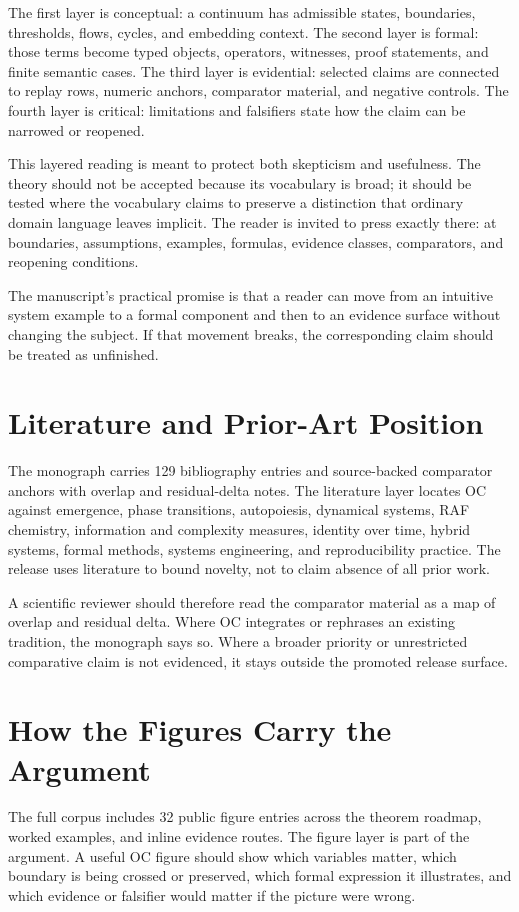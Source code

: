 The first layer is conceptual: a continuum has admissible states, boundaries, thresholds, flows, cycles, and embedding context. The second layer is formal: those terms become typed objects, operators, witnesses, proof statements, and finite semantic cases. The third layer is evidential: selected claims are connected to replay rows, numeric anchors, comparator material, and negative controls. The fourth layer is critical: limitations and falsifiers state how the claim can be narrowed or reopened.

This layered reading is meant to protect both skepticism and usefulness. The theory should not be accepted because its vocabulary is broad; it should be tested where the vocabulary claims to preserve a distinction that ordinary domain language leaves implicit. The reader is invited to press exactly there: at boundaries, assumptions, examples, formulas, evidence classes, comparators, and reopening conditions.

The manuscript's practical promise is that a reader can move from an intuitive system example to a formal component and then to an evidence surface without changing the subject. If that movement breaks, the corresponding claim should be treated as unfinished.


\section{Literature and Prior-Art Position}
\label{sec:oc133-literature-prior-art-position}
The monograph carries 129 bibliography entries and source-backed comparator anchors with overlap and residual-delta notes. The literature layer locates OC against emergence, phase transitions, autopoiesis, dynamical systems, RAF chemistry, information and complexity measures, identity over time, hybrid systems, formal methods, systems engineering, and reproducibility practice. The release uses literature to bound novelty, not to claim absence of all prior work.

A scientific reviewer should therefore read the comparator material as a map of overlap and residual delta. Where OC integrates or rephrases an existing tradition, the monograph says so. Where a broader priority or unrestricted comparative claim is not evidenced, it stays outside the promoted release surface.


\section{How the Figures Carry the Argument}
\label{sec:oc133-figure-route-design-logic}
The full corpus includes 32 public figure entries across the theorem roadmap, worked examples, and inline evidence routes. The figure layer is part of the argument. A useful OC figure should show which variables matter, which boundary is being crossed or preserved, which formal expression it illustrates, and which evidence or falsifier would matter if the picture were wrong.

